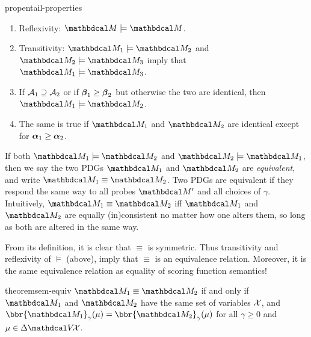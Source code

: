    \begin{linked}{prop}{entail-properties}
        \begin{enumerate}[parsep=0pt,topsep=0pt]
            \item Reflexivity: $\dg M \models \dg M$.
            \item Transitivity: $\dg M_1 \models \dg M_2$ and $\dg M_2 \models \dg M_3$ imply that $\dg M_1 \models \dg M_3$. 
            \item If 
                $\mathcal A_1 \supseteq \mathcal A_2$
                 or if $\boldsymbol\beta_1 \ge \boldsymbol\beta_2$ but otherwise the two are identical, then $\dg M_1 \models \dg M_2$. 
            \item The same is true if $\dg M_1$ and $\dg M_2$ are identical except for
            $\boldsymbol\alpha_1 \ge \boldsymbol\alpha_2$.%
        \end{enumerate}
    \end{linked}
    
    
    If both $\dg M_1 \models \dg M_2$ and $\dg M_2 \models \dg M_1$, 
        then we say the two PDGs $\dg M_1$ and $\dg M_2$ are \emph{equivalent}, and write $\dg M_1 \equiv \dg M_2$.
    Two PDGs are equivalent if they respond the same way to all probes $\dg M'$ and all choices of $\gamma$.
    Intuitively, $\dg M_1 \equiv \dg M_2$ iff $\dg M_1$ and $\dg M_2$ are equally (in)consistent no matter how one alters them, so long as both are altered in the same way. 
    

From its definition, it is clear that $\equiv$ is symmetric.
Thus transitivity and reflexivity of $\models$ (above), imply that
$\equiv$ is an equivalence relation. Moreover, it is the same equivalence relation as equality of scoring function semantics!

\begin{linked}{theorem}{sem-equiv}
    $\dg M_1 \equiv \dg M_2$ if and only if 
    $\dg M_1$ and $\dg M_2$ have the same set of variables $\mathcal X$, and
    $\bbr{\dg M_1}_\gamma(\mu) = \bbr{\dg M_2}_\gamma(\mu)$
    for all $\gamma \ge 0$ and $\mu \in \Delta\V\!\X$.
\end{linked}    


